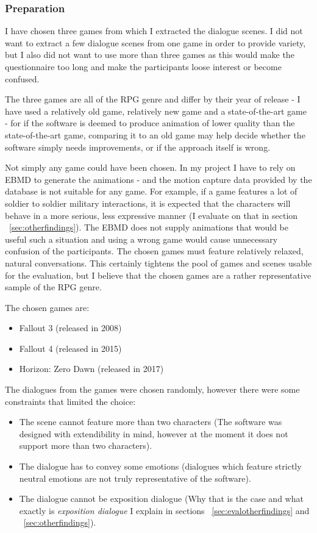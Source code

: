 \medskip
\subsubsection{Preparation}
I have chosen three games from which I extracted the dialogue scenes. I did not want to extract a few dialogue scenes from one game in order to provide variety, but I also did not want to use more than three games as this would make the questionnaire too long and make the participants loose interest or become confused.

The three games are all of the RPG genre and differ by their year of release - I have used a relatively old game, relatively new game and a state-of-the-art game - for if the software is deemed to produce animation of lower quality than the state-of-the-art game, comparing it to an old game may help decide whether the software simply needs improvements, or if the approach itself is wrong.

Not simply any game could have been chosen. In my project I have to rely on EBMD to generate the animations - and the motion capture data provided by the database is not suitable for any game. For example, if a game features a lot of soldier to soldier military interactions, it is expected that the characters will behave in a more serious, less expressive manner (I evaluate on that in section ~\ref{sec:otherfindings}). The EBMD does not supply animations that would be useful such a situation and using a wrong game would cause unnecessary confusion of the participants. The chosen games must feature relatively relaxed, natural conversations. This certainly tightens the pool of games and scenes usable for the evaluation, but I believe that the chosen games are a rather representative sample of the RPG genre.

The chosen games are:
\begin{itemize}
	\item Fallout 3 (released in 2008)
	\item Fallout 4 (released in 2015)
	\item Horizon: Zero Dawn (released in 2017)
\end{itemize}

The dialogues from the games were chosen randomly, however there were some constraints that limited the choice:
\begin{itemize}
	\item The scene cannot feature more than two characters (The software was designed with extendibility in mind, however at the moment it does not support more than two characters).
	\item The dialogue has to convey some emotions (dialogues which feature strictly neutral emotions are not truly representative of the software).
	\item The dialogue cannot be exposition dialogue (Why that is the case and what exactly is \textit{exposition dialogue} I explain in sections ~\ref{sec:evalotherfindings} and ~\ref{sec:otherfindings}).
\end{itemize}




